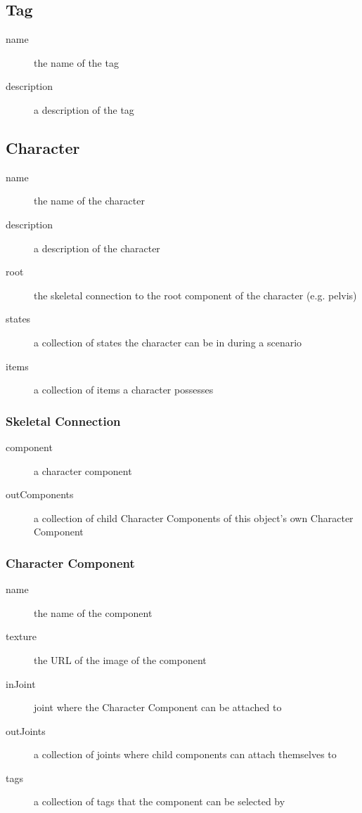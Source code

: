 \subsection{Tag}
\begin{description}
\item[name]{the name of the tag}
\item[description]{a description of the tag}
\end{description}

\subsection{Character}
\begin{description}
\item[name]{the name of the character}
\item[description]{a description of the character}
\item[root]{the skeletal connection to the root component of the character (e.g. pelvis)}
\item[states]{a collection of states the character can be in during a scenario}
\item[items]{a collection of items a character possesses}
\end{description}

\subsubsection{Skeletal Connection}
\begin{description}
\item[component]{a character component}
\item[outComponents]{a collection of child Character Components of this object's own Character Component}
\end{description}

\subsubsection{Character Component}
\begin{description}
\item[name]{the name of the component}
\item[texture]{the URL of the image of the component}
\item[inJoint]{joint where the Character Component can be attached to}
\item[outJoints]{a collection of joints where child components can attach themselves to}
\item[tags]{a collection of tags that the component can be selected by}
\end{description}

